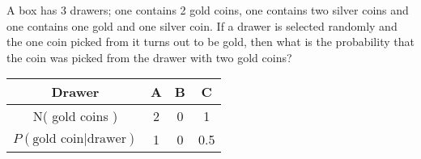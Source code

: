 
%
%
%
%
% 
% 

\question A box has 3 drawers; one contains 2 gold coins, one contains two silver coins
and one contains one gold and one silver coin. If a drawer is selected randomly 
and the one coin picked from it turns out to be gold, then what is the probability
that the coin was picked from the drawer with two gold coins? 

\insertQR{}

\ifprintanswers
  \begin{table}
    \begin{tabular}{cccc}
       \toprule
       Drawer & A & B & C \\
       \midrule
       N( gold coins ) & 2 & 0 & 1 \\
       $P(\text{gold coin} \vert \text{drawer})$ & 1 & 0 & 0.5 \\
       \bottomrule
    \end{tabular}
  \end{table}
\fi 

